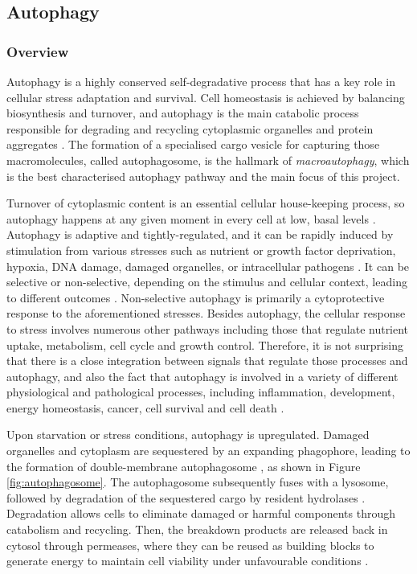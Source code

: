     
    
    
    
    
        
        
        
     \newpage   
    \subsection{Autophagy}
    
    \subsubsection{Overview}

    Autophagy is a highly conserved self-degradative process that has a key role in cellular stress adaptation and survival. Cell homeostasis is achieved by balancing biosynthesis and turnover, and autophagy is the main catabolic process responsible for degrading and recycling cytoplasmic organelles and protein aggregates \cite{Feng2015}. The formation of a specialised cargo vesicle for capturing those macromolecules, called autophagosome, is the hallmark of \textit{macroautophagy}, which is the best characterised autophagy pathway and the main focus of this project. 

    Turnover of cytoplasmic content is an essential cellular house-keeping process, so autophagy happens at any given moment in every cell at low, basal levels \cite{levine2008autophagy}. Autophagy is adaptive and tightly-regulated, and it can be rapidly induced by stimulation from various stresses such as nutrient or growth factor deprivation, hypoxia, DNA damage, damaged organelles, or intracellular pathogens \cite{Kroemer2010}. It can be selective or non-selective, depending on the stimulus and cellular context, leading to different outcomes \cite{Feng2015}. Non-selective autophagy is primarily a cytoprotective response to the aforementioned stresses. 
    Besides autophagy, the cellular response to stress involves numerous other pathways including those that regulate nutrient uptake, metabolism, cell cycle and growth control. Therefore, it is not surprising that there is a close integration between signals that regulate those processes and autophagy, and also the fact that autophagy is involved in a variety of different physiological and pathological processes, including inflammation, development, energy homeostasis, cancer, cell survival and cell death \cite{levine2008autophagy}.

    Upon starvation or stress conditions, autophagy is upregulated. Damaged organelles and cytoplasm are sequestered by an expanding phagophore, leading to the formation of double-membrane autophagosome \cite{Feng2015}, as shown in Figure \ref{fig:autophagosome}. The autophagosome subsequently fuses with a lysosome, followed by degradation of the sequestered cargo by resident hydrolases \cite{Yorimitsu2005Autophagy:Self-eating}. Degradation allows cells to eliminate damaged or harmful components through catabolism and recycling. Then, the breakdown products are released back in cytosol through permeases, where they can be reused as building blocks to generate energy to maintain cell viability under unfavourable conditions \cite{Feng2013TheMacroautophagy}. 


